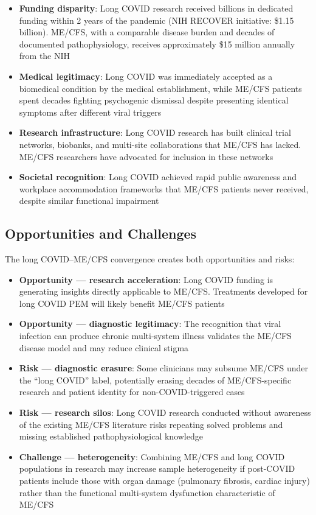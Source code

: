 \begin{itemize}
    \item \textbf{Funding disparity}: Long COVID research received billions in dedicated funding within 2 years of the pandemic (NIH RECOVER initiative: \$1.15 billion). ME/CFS, with a comparable disease burden and decades of documented pathophysiology, receives approximately \$15 million annually from the NIH
    \item \textbf{Medical legitimacy}: Long COVID was immediately accepted as a biomedical condition by the medical establishment, while ME/CFS patients spent decades fighting psychogenic dismissal despite presenting identical symptoms after different viral triggers
    \item \textbf{Research infrastructure}: Long COVID research has built clinical trial networks, biobanks, and multi-site collaborations that ME/CFS has lacked. ME/CFS researchers have advocated for inclusion in these networks
    \item \textbf{Societal recognition}: Long COVID achieved rapid public awareness and workplace accommodation frameworks that ME/CFS patients never received, despite similar functional impairment
\end{itemize}

\subsection{Opportunities and Challenges}

The long COVID--ME/CFS convergence creates both opportunities and risks:

\begin{itemize}
    \item \textbf{Opportunity --- research acceleration}: Long COVID funding is generating insights directly applicable to ME/CFS. Treatments developed for long COVID PEM will likely benefit ME/CFS patients
    \item \textbf{Opportunity --- diagnostic legitimacy}: The recognition that viral infection can produce chronic multi-system illness validates the ME/CFS disease model and may reduce clinical stigma
    \item \textbf{Risk --- diagnostic erasure}: Some clinicians may subsume ME/CFS under the ``long COVID'' label, potentially erasing decades of ME/CFS-specific research and patient identity for non-COVID-triggered cases
    \item \textbf{Risk --- research silos}: Long COVID research conducted without awareness of the existing ME/CFS literature risks repeating solved problems and missing established pathophysiological knowledge
    \item \textbf{Challenge --- heterogeneity}: Combining ME/CFS and long COVID populations in research may increase sample heterogeneity if post-COVID patients include those with organ damage (pulmonary fibrosis, cardiac injury) rather than the functional multi-system dysfunction characteristic of ME/CFS
\end{itemize}


